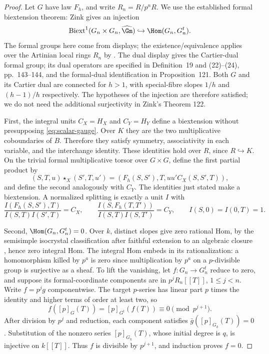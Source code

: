 \documentclass[11pt,a4paper]{article}
\theoremstyle{definition}\newtheorem{remark}[theorem]{Remark}
\begin{document}
\begin{proof}
Let $G$ have law $F_h$, and write $R_n=R/p^nR$. We use the established formal biextension theorem: Zink \cite[\S4.4, Proposition 121 and (243), pp.~241, 246]{Zink} gives an injection
\[
 \operatorname{Biext}^1(G_n\times G_n,\widehat{\Gm})
 \hookrightarrow\Hom(G_n,G_n^t).
\]
The formal groups here come from displays; the existence/equivalence applies over the Artinian local rings $R_n$ by \cite[Theorem 9, p.~132, or Theorem 103, p.~221]{Zink}. The dual display gives the Cartier-dual formal group; its dual operators are specified in Definition~19 and (22)--(24), pp.~143--144, and the formal-dual identification in Proposition~121. Both $G$ and its Cartier dual are connected for $h>1$, with special-fibre slopes $1/h$ and $(h-1)/h$ respectively. The hypotheses of the injection are therefore satisfied; we do not need the additional surjectivity in Zink's Theorem 122.

First, the integral units $C_X=H_X$ and $C_Y=H_Y$ define a biextension without presupposing \eqref{eq:scalar-gauge}. Over $K$ they are the two multiplicative coboundaries of $B$. Therefore they satisfy symmetry, associativity in each variable, and the interchange identity. These identities hold over $R$, since $R\hookrightarrow K$. On the trivial formal multiplicative torsor over $G\times G$, define the first partial product by
\[
 (S,T,u)\star_X(S',T,u')
  =(F_h(S,S'),T,uu'C_X(S,S',T)),
\]
and define the second analogously with $C_Y$. The identities just stated make a biextension. A normalized splitting is exactly a unit $I$ with
\begin{equation}\label{eq:gauge-split}
 \frac{I(F_h(S,S'),T)}{I(S,T)I(S',T)}=C_X,\qquad
 \frac{I(S,F_h(T,T'))}{I(S,T)I(S,T')}=C_Y,
 \qquad I(S,0)=I(0,T)=1.
\end{equation}

Second, $\Hom(G_n,G_n^t)=0$. Over $k$, distinct slopes give zero rational Hom, by the semisimple isocrystal classification after faithful extension to an algebraic closure \cite[\S1.3, first paragraph of p.~120]{Katz79}, hence zero integral Hom. The integral Hom embeds in its rationalization: a homomorphism killed by $p^a$ is zero since multiplication by $p^a$ on a $p$-divisible group is surjective as a sheaf. To lift the vanishing, let $f:G_n\to G_n^t$ reduce to zero, and suppose its formal-coordinate components are in $p^jR_n[[T]]$, $1\le j<n$. Write $f=p^jg$ componentwise. The target $p$-series has linear part $p$ times the identity and higher terms of order at least two, so
\[
 f([p]_G(T))=[p]_{G^t}(f(T))\equiv0\pmod {p^{j+1}}.
\]
After division by $p^j$ and reduction, each component satisfies $\bar g([p]_{G_k}(T))=0$. Substitution of the nonzero series $[p]_{G_k}(T)$, whose initial degree is $q$, is injective on $k[[T]]$. Thus $f$ is divisible by $p^{j+1}$, and induction proves $f=0$.


\end{proof}
\end{document}
